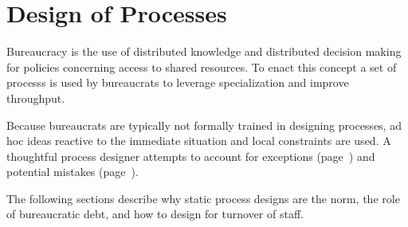 \section{Design of Processes\label{sec:design-of-processes}}

Bureaucracy is the use of distributed knowledge and distributed decision making for policies concerning access to shared resources. To enact this concept a set of \glspl{process} is used by \glspl{bureaucrat} to leverage specialization and improve throughput. 
    
Because bureaucrats are typically not formally trained in designing processes, ad hoc ideas reactive to the immediate situation and local constraints are used. A thoughtful process designer attempts to account for exceptions (page~\pageref{sec:exceptions-to-process}) and potential mistakes (page~\pageref{sec:process-mistakes}).

The following sections describe why static process designs are the norm, the role of bureaucratic debt, and how to design for turnover of staff.
    




 